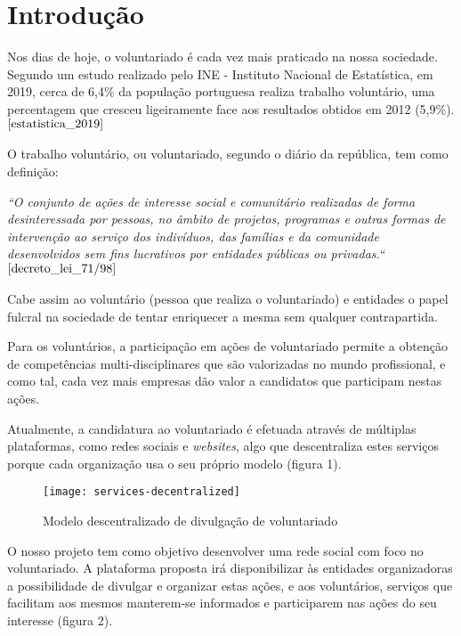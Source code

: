 \section{Introdução} \bigskip
Nos dias de hoje, o voluntariado é cada vez mais praticado na nossa sociedade. Segundo um estudo realizado pelo INE - Instituto Nacional de Estatística, em 2019, cerca de 6,4\% da população portuguesa realiza trabalho voluntário, uma percentagem que cresceu ligeiramente face aos resultados obtidos em 2012 (5,9\%).$^{\cite{estatistica_2019}}$
\par \bigskip

O trabalho voluntário, ou voluntariado, segundo o diário da república, tem como definição: \par \bigskip

\textit{
	``O conjunto de ações de interesse social e comunitário realizadas de forma desinteressada por pessoas, no âmbito de projetos, programas e outras formas de intervenção ao serviço dos indivíduos, das famílias e da comunidade desenvolvidos sem fins lucrativos por entidades públicas ou privadas.``
}$^{\cite{decreto_lei_71/98}}$ \par \bigskip

Cabe assim ao voluntário (pessoa que realiza o voluntariado) e entidades o papel fulcral na sociedade de tentar enriquecer a mesma sem qualquer contrapartida. \par \bigskip

Para os voluntários, a participação em ações de voluntariado permite a obtenção de competências multi-disciplinares que são valorizadas no mundo profissional, e como tal, cada vez mais empresas dão valor a candidatos que participam nestas ações. \par \bigskip

Atualmente, a candidatura ao voluntariado é efetuada através de múltiplas plataformas, como redes sociais e \textit{websites}, algo que descentraliza estes serviços porque cada organização usa o seu próprio modelo (figura 1).

\bigskip

\begin{figure}[h]
	\centering
	\texttt{[image: services-decentralized]}
	\caption{Modelo descentralizado de divulgação de voluntariado}	
\end{figure}

\newpage

O nosso projeto tem como objetivo desenvolver uma rede social  com foco no voluntariado. A plataforma proposta irá disponibilizar às entidades organizadoras a possibilidade de divulgar e organizar estas ações, e aos voluntários, serviços que facilitam aos mesmos manterem-se informados e participarem nas ações do seu interesse (figura 2).

